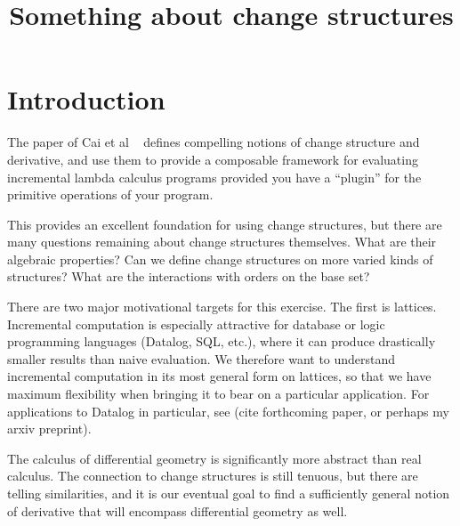 
%

\usepackage{amsmath}
\usepackage{amsthm}
\usepackage{amssymb}
\usepackage{mathtools}






%

\title{Something about change structures}

\maketitle

\section{Introduction}

The paper of Cai et al ~\cite{cai2014changes} defines compelling notions
of change structure and derivative, and use them to provide a composable framework for
evaluating incremental lambda calculus programs provided you have a ``plugin'' for the
primitive operations of your program.

This provides an excellent foundation for using change structures, but there are
many questions remaining about change structures themselves. What are their
algebraic properties? Can we define change structures on more varied kinds of
structures? What are the interactions with orders on the base set?

There are two major motivational targets for this exercise. The first is
lattices. Incremental computation is especially attractive for database or logic
programming languages (Datalog, SQL, etc.), where it can produce drastically
smaller results than naive evaluation. We therefore want to understand
incremental computation in its most general form on lattices, so that we have
maximum flexibility when bringing it to bear on a particular application. For
applications to Datalog in particular, see (cite forthcoming paper, or perhaps
my arxiv preprint).

The calculus of differential geometry is significantly more abstract than real
calculus. The connection to change structures is still tenuous, but there are
telling similarities, and it is our eventual goal to find a sufficiently general
notion of derivative that will encompass differential geometry as well.

